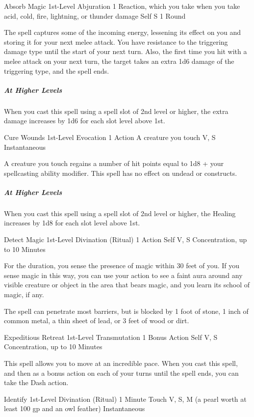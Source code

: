 {\DndSpellHeader
  {Absorb Magic}
  {1st-Level Abjuration}
  {1 Reaction, which you take when you take acid, cold, fire, lightning, or thunder damage}
  {Self}
  {S}
  {1 Round}
  
The spell captures some of the incoming energy, lessening its effect on you and storing it for your next melee attack. You have resistance to the triggering damage type until the start of your next turn. Also, the first time you hit with a melee attack on your next turn, the target takes an extra 1d6 damage of the triggering type, and the spell ends.

\subparagraph*{At Higher Levels} When you cast this spell using a spell slot of 2nd level or higher, the extra damage increases by 1d6 for each slot level above 1st.

\DndSpellHeader
  {Cure Wounds}
  {1st-Level Evocation}
  {1 Action}
  {A creature you touch}
  {V, S}
  {Instantaneous}
  
A creature you touch regains a number of hit points equal to 1d8 + your spellcasting ability modifier. This spell has no effect on undead or constructs.

\subparagraph*{At Higher Levels} When you cast this spell using a spell slot of 2nd level or higher, the Healing increases by 1d8 for each slot level above 1st.

\DndSpellHeader
  {Detect Magic}
  {1st-Level Divination (Ritual)}
  {1 Action}
  {Self}
  {V, S}
  {Concentration, up to 10 Minutes}

For the duration, you sense the presence of magic within 30 feet of you. If you sense magic in this way, you can use your action to see a faint aura around any visible creature or object in the area that bears magic, and you learn its school of magic, if any.

The spell can penetrate most barriers, but is blocked by 1 foot of stone, 1 inch of common metal, a thin sheet of lead, or 3 feet of wood or dirt.

\DndSpellHeader
  {Expeditious Retreat}
  {1st-Level Transmutation}
  {1 Bonus Action}
  {Self}
  {V, S}
  {Concentration, up to 10 Minutes}

This spell allows you to move at an incredible pace. When you cast this spell, and then as a bonus action on each of your turns until the spell ends, you can take the Dash action.

\DndSpellHeader
  {Identify}
  {1st-Level Divination (Ritual)}
  {1 Minute}
  {Touch}
  {V, S, M (a pearl worth at least 100 gp and an owl feather)}
  {Instantaneous}

}
